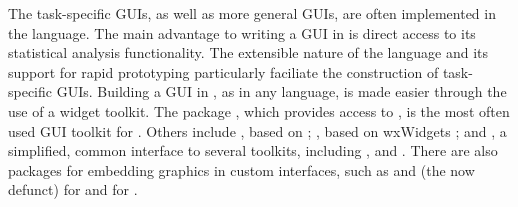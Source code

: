 \documentclass[article,shortnames]{jss}
\begin{document}
The task-specific GUIs, as well as more general  GUIs,
are often implemented in the  language. The main advantage
to 
writing a GUI in  is direct access to its statistical
analysis
functionality. The extensible nature of the  language and
its support 
for rapid prototyping particularly faciliate the construction of
task-specific GUIs.
Building a GUI in , as in any language, is made easier
through the use of a 
widget toolkit. The  package \citep{Rnews:Dalgaard:2001a,
Rnews:Dalgaard:2002},
which provides access to  \citep{ousterhout,welch}, is the
most often 
used GUI toolkit for . Others include 
\citep{RGtk}, based
on ;  \citep{RwxWidgets}, based
on
wxWidgets \citep{wxwidgets}; and  \citep{gWidgets}, a
simplified, common interface to several toolkits, including
, 
and  . There are also packages for embedding
graphics in custom interfaces, such as  \citep{cairoDevice} and (the now defunct) 
\citep{gtkDevice} for  and  
\citep{tkrplot} for .
\end{document}
